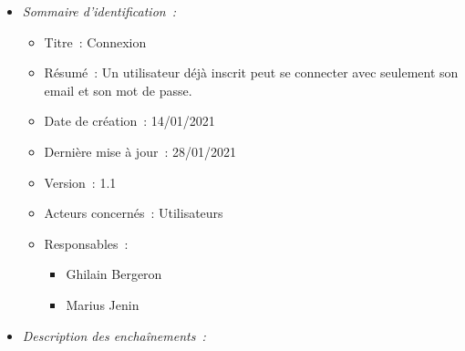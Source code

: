\begin{itemize}

\item \textit{Sommaire d'identification~:}

    \begin{itemize}
    
    \item Titre~: Connexion
    
    \item Résumé~: Un utilisateur déjà inscrit peut se connecter avec seulement son email et son mot de passe.
    
    \item Date de création~: 14/01/2021
    
    \item Dernière mise à jour~: 28/01/2021
    
    \item Version~: 1.1
    
    \item Acteurs concernés~: Utilisateurs
    
    \item Responsables~:
    
        \begin{itemize}
            \item Ghilain Bergeron
            \item Marius Jenin
        \end{itemize}
    
    \end{itemize}

\item \textit{Description des enchaînements~:}


\end{itemize}
